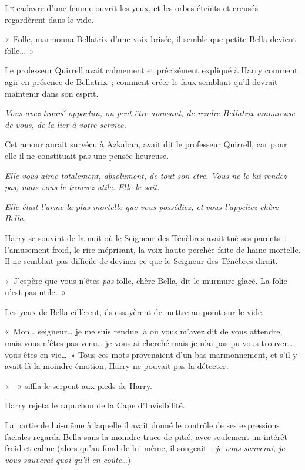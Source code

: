 
\lettrine{L}{e} cadavre d'une femme ouvrit les yeux, et les orbes éteints et creusés regardèrent dans le vide.

«~Folle, marmonna Bellatrix d'une voix brisée, il semble que petite Bella devient folle…~»

Le professeur Quirrell avait calmement et précisément expliqué à Harry comment agir en présence de Bellatrix~; comment créer le faux-semblant qu'il devrait maintenir dans son esprit.

\emph{Vous avez trouvé opportun, ou peut-être amusant, de rendre Bellatrix amoureuse de vous, de la lier à votre service.}

Cet amour aurait survécu à Azkaban, avait dit le professeur Quirrell, car pour elle il ne constituait pas une pensée heureuse.

\emph{Elle vous aime totalement, absolument, de tout son être.
Vous ne le lui rendez pas, mais vous le trouvez utile.
Elle le sait.}

\emph{Elle était l'arme la plus mortelle que vous possédiez, et vous l'appeliez chère Bella.}

Harry se souvint de la nuit où le Seigneur des Ténèbres avait tué ses parents~: l'amusement froid, le rire méprisant, la voix haute perchée faite de haine mortelle.
Il ne semblait pas difficile de deviner ce que le Seigneur des Ténèbres dirait.

«~J'espère que vous n'êtes \emph{pas} folle, chère Bella, dit le murmure glacé.
La folie n'est pas utile.~»

Les yeux de Bella cillèrent, ils essayèrent de mettre au point sur le vide.

«~Mon… seigneur… je me suis rendue là où vous m'avez dit de vous attendre, mais vous n'êtes pas venu… je vous ai cherché mais je n'ai pas pu vous trouver… vous êtes en vie…~»
Tous ces mots provenaient d'un bas marmonnement, et s'il y avait là la moindre émotion, Harry ne pouvait pas la détecter.

«~~» siffla le serpent aux pieds de Harry.

Harry rejeta le capuchon de la Cape d'Invisibilité.

La partie de lui-même à laquelle il avait donné le contrôle de ses expressions faciales regarda Bella sans la moindre trace de pitié, avec seulement un intérêt froid et calme (alors qu'au fond de lui-même, il songeait~: \emph{je vous sauverai, je vous sauverai quoi qu'il en coûte…})

